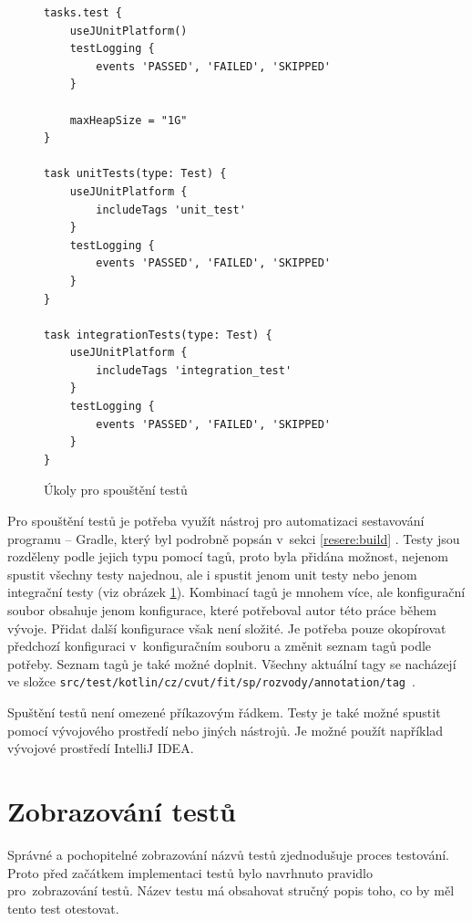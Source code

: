     \begin{figure}
        \begin{verbatim}
tasks.test {
    useJUnitPlatform()
    testLogging {
        events 'PASSED', 'FAILED', 'SKIPPED'
    }

    maxHeapSize = "1G"
}

task unitTests(type: Test) {
    useJUnitPlatform {
        includeTags 'unit_test'
    }
    testLogging {
        events 'PASSED', 'FAILED', 'SKIPPED'
    }
}

task integrationTests(type: Test) {
    useJUnitPlatform {
        includeTags 'integration_test'
    }
    testLogging {
        events 'PASSED', 'FAILED', 'SKIPPED'
    }
}
        \end{verbatim}
        \caption{Úkoly pro spouštění testů} 
        \label{code:gradle-tests}
    \end{figure}
    Pro spouštění testů je potřeba využít nástroj pro automatizaci sestavování programu -- Gradle, který byl podrobně popsán v~sekci \ref{resere:build} . Testy jsou rozděleny podle jejich typu pomocí tagů, proto byla přidána možnost, nejenom spustit všechny testy najednou, ale i spustit jenom unit testy nebo jenom integrační testy (viz obrázek \ref{code:gradle-tests}). Kombinací tagů je mnohem více, ale konfigurační soubor obsahuje jenom konfigurace, které potřeboval autor této práce během vývoje. 
    Přidat další konfigurace však není složité. Je potřeba pouze okopírovat předchozí konfiguraci v~konfiguračním souboru a změnit seznam tagů podle potřeby. Seznam tagů je také možné doplnit. Všechny aktuální tagy se nacházejí ve složce \verb|src/test/kotlin/cz/cvut/fit/sp/rozvody/annotation/tag|~.
    
    Spuštění testů není omezené příkazovým řádkem. Testy je také možné spustit pomocí vývojového prostředí nebo jiných nástrojů. Je možné použít například vývojové prostředí IntelliJ IDEA. 
\section{Zobrazování testů}\label{testovani:zobrazovani}
    Správné a pochopitelné zobrazování názvů testů zjednodušuje proces testování. Proto před začátkem implementaci testů bylo navrhnuto pravidlo pro~zobrazování testů. Název testu má obsahovat stručný popis toho, co by měl tento test otestovat. 
    
